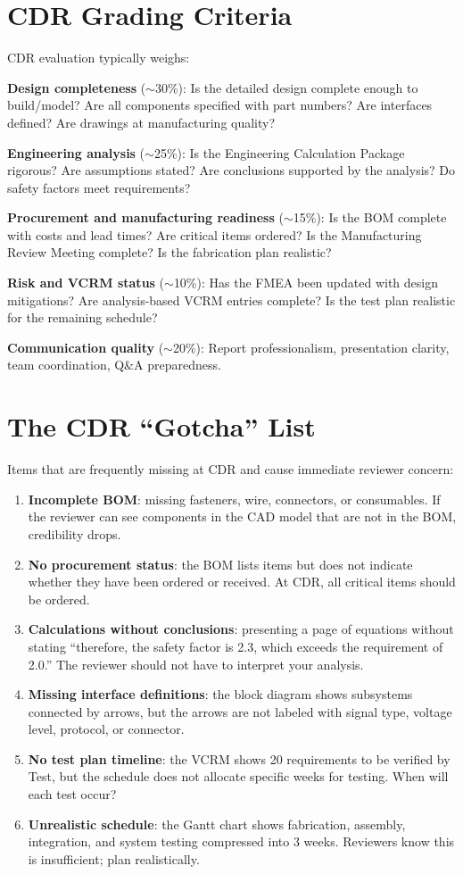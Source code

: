 \section{CDR Grading Criteria}
CDR evaluation typically weighs:

\textbf{Design completeness} ($\sim$30\%): Is the detailed design complete enough to build/model? Are all components specified with part numbers? Are interfaces defined? Are drawings at manufacturing quality?

\textbf{Engineering analysis} ($\sim$25\%): Is the Engineering Calculation Package rigorous? Are assumptions stated? Are conclusions supported by the analysis? Do safety factors meet requirements?

\textbf{Procurement and manufacturing readiness} ($\sim$15\%): Is the BOM complete with costs and lead times? Are critical items ordered? Is the Manufacturing Review Meeting complete? Is the fabrication plan realistic?

\textbf{Risk and VCRM status} ($\sim$10\%): Has the FMEA been updated with design mitigations? Are analysis-based VCRM entries complete? Is the test plan realistic for the remaining schedule?

\textbf{Communication quality} ($\sim$20\%): Report professionalism, presentation clarity, team coordination, Q\&A preparedness.

\section{The CDR ``Gotcha'' List}
Items that are frequently missing at CDR and cause immediate reviewer concern:

\begin{enumerate}[nosep,leftmargin=1.5em]
\item \textbf{Incomplete BOM}: missing fasteners, wire, connectors, or consumables. If the reviewer can see components in the CAD model that are not in the BOM, credibility drops.
\item \textbf{No procurement status}: the BOM lists items but does not indicate whether they have been ordered or received. At CDR, all critical items should be ordered.
\item \textbf{Calculations without conclusions}: presenting a page of equations without stating ``therefore, the safety factor is 2.3, which exceeds the requirement of 2.0.'' The reviewer should not have to interpret your analysis.
\item \textbf{Missing interface definitions}: the block diagram shows subsystems connected by arrows, but the arrows are not labeled with signal type, voltage level, protocol, or connector.
\item \textbf{No test plan timeline}: the VCRM shows 20 requirements to be verified by Test, but the schedule does not allocate specific weeks for testing. When will each test occur?
\item \textbf{Unrealistic schedule}: the Gantt chart shows fabrication, assembly, integration, and system testing compressed into 3 weeks. Reviewers know this is insufficient; plan realistically.
\end{enumerate}




